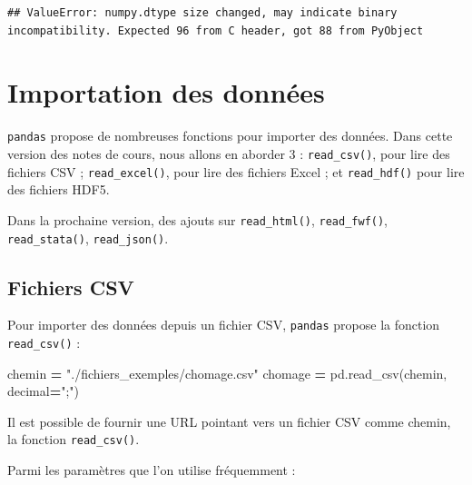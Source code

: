 \documentclass[
  12pt,
]{book}
\newenvironment{Shaded}{\begin{snugshade}}{\end{snugshade}}
\newcommand{\NormalTok}[1]{#1}
\newcommand{\OperatorTok}[1]{\textcolor[rgb]{0.81,0.36,0.00}{\textbf{#1}}}
\newcommand{\StringTok}[1]{\textcolor[rgb]{0.31,0.60,0.02}{#1}}
\numberwithin{equation}{section}
\numberwithin{countremarque}{section}
\begin{document}
\begin{lstlisting}
## ValueError: numpy.dtype size changed, may indicate binary incompatibility. Expected 96 from C header, got 88 from PyObject
\end{lstlisting}

\section{Importation des données}\label{importation-des-donnuxe9es}

\texttt{pandas} propose de nombreuses fonctions pour importer des données. Dans cette version des notes de cours, nous allons en aborder 3 : \texttt{read\_csv()}, pour lire des fichiers CSV ; \texttt{read\_excel()}, pour lire des fichiers Excel ; et \texttt{read\_hdf()} pour lire des fichiers HDF5.

Dans la prochaine version, des ajouts sur \texttt{read\_html()}, \texttt{read\_fwf()}, \texttt{read\_stata()}, \texttt{read\_json()}.

\subsection{Fichiers CSV}\label{pandas-importation-csv}

Pour importer des données depuis un fichier CSV, \texttt{pandas} propose la fonction \texttt{read\_csv()} :

\begin{Shaded}
\begin{Highlighting}[]
\NormalTok{chemin }\OperatorTok{=} \StringTok{"./fichiers\_exemples/chomage.csv"}
\NormalTok{chomage }\OperatorTok{=}\NormalTok{ pd.read\_csv(chemin, decimal}\OperatorTok{=}\StringTok{";"}\NormalTok{)}
\end{Highlighting}
\end{Shaded}

Il est possible de fournir une URL pointant vers un fichier CSV comme chemin, la fonction \texttt{read\_csv()}.

Parmi les paramètres que l'on utilise fréquemment :
\end{document}
